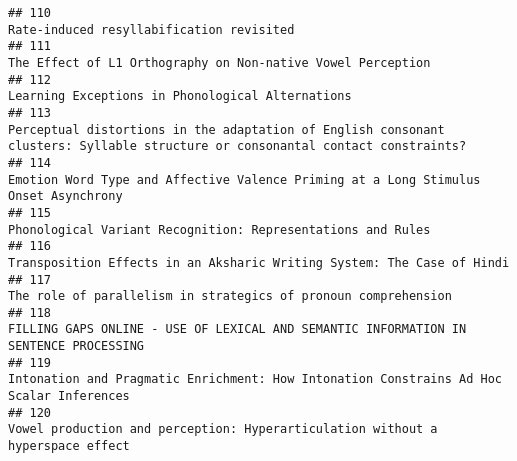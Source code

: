 \documentclass[
  english,
  man]{apa6}
\begin{document}
\begin{verbatim}
## 110                                                                                                                                                                                                 Rate-induced resyllabification revisited
## 111                                                                                                                                                                              The Effect of L1 Orthography on Non-native Vowel Perception
## 112                                                                                                                                                                                         Learning Exceptions in Phonological Alternations
## 113                                                                                                           Perceptual distortions in the adaptation of English consonant clusters: Syllable structure or consonantal contact constraints?
## 114                                                                                                                                                      Emotion Word Type and Affective Valence Priming at a Long Stimulus Onset Asynchrony
## 115                                                                                                                                                                              Phonological Variant Recognition: Representations and Rules
## 116                                                                                                                                                                   Transposition Effects in an Aksharic Writing System: The Case of Hindi
## 117                                                                                                                                                                           The role of parallelism in strategics of pronoun comprehension
## 118                                                                                                                                                     FILLING GAPS ONLINE - USE OF LEXICAL AND SEMANTIC INFORMATION IN SENTENCE PROCESSING
## 119                                                                                                                                                  Intonation and Pragmatic Enrichment: How Intonation Constrains Ad Hoc Scalar Inferences
## 120                                                                                                                                                           Vowel production and perception: Hyperarticulation without a hyperspace effect

\end{verbatim}
\end{document}
